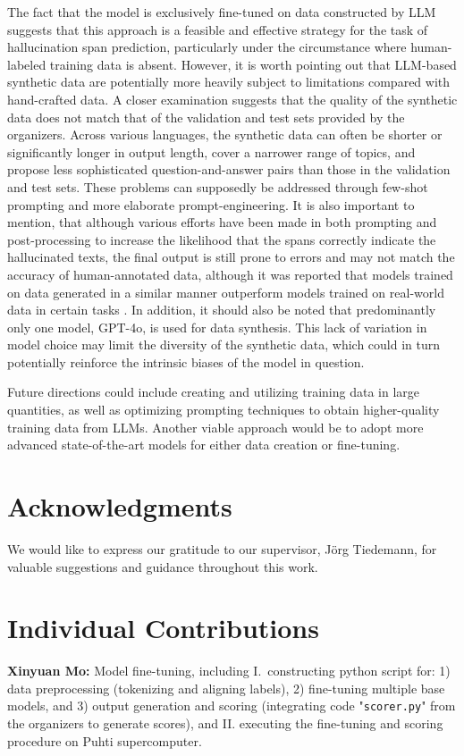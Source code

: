 \documentclass[11pt]{article}
\begin{document}
The fact that the model is exclusively fine-tuned on data constructed by LLM suggests that this approach is a feasible and effective strategy for the task of hallucination span prediction, particularly under the circumstance where human-labeled training data is absent. However, it is worth pointing out that LLM-based synthetic data are potentially more heavily subject to limitations compared with hand-crafted data. A closer examination suggests that the quality of the synthetic data does not match that of the validation and test sets provided by the organizers. Across various languages, the synthetic data can often be shorter or significantly longer in output length, cover a narrower range of topics, and propose less sophisticated question-and-answer pairs than those in the validation and test sets. These problems can supposedly be addressed through few-shot prompting and more elaborate prompt-engineering. It is also important to mention, that although various efforts have been made in both prompting and post-processing to increase the likelihood that the spans correctly indicate the hallucinated texts, the final output is still prone to errors and may not match the accuracy of human-annotated data, although it was reported that models trained on data generated in a similar manner outperform models trained on real-world data in certain tasks \cite{li-etal-2023-synthetic}. In addition, it should also be noted that predominantly only one model, GPT-4o, is used for data synthesis. This lack of variation in model choice may limit the diversity of the synthetic data, which could in turn potentially reinforce the intrinsic biases of the model in question.

Future directions could include creating and utilizing training data in large quantities, as well as optimizing prompting techniques to obtain higher-quality training data from LLMs. Another viable approach would be to adopt more advanced state-of-the-art models for either data creation or fine-tuning.

\section{Acknowledgments}
We would like to express our gratitude to our supervisor, Jörg Tiedemann, for valuable suggestions and guidance throughout this work.

\section{Individual Contributions}
\textbf{Xinyuan Mo: } Model fine-tuning, including I.~constructing python script for: 1) data preprocessing (tokenizing and aligning labels), 2) fine-tuning multiple base models, and 3) output generation and scoring (integrating code "\texttt{scorer.py}" from the organizers to generate scores), and II. executing the fine-tuning and scoring procedure on Puhti supercomputer. 
\end{document}
